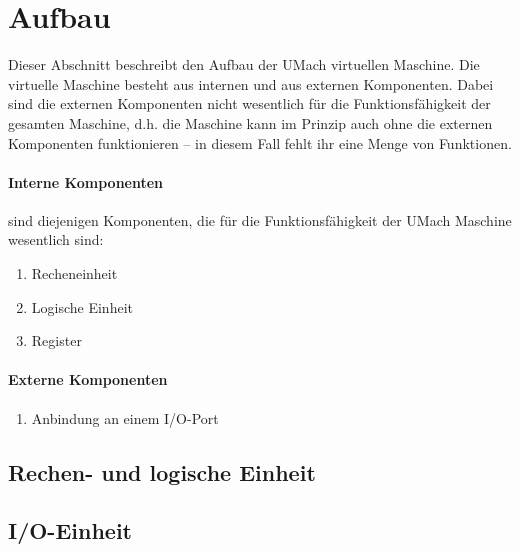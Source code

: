 \section{Aufbau}
\label{sec:Aufbau}
Dieser Abschnitt beschreibt den Aufbau der UMach virtuellen Maschine.
Die virtuelle Maschine besteht aus internen und aus externen Komponenten. Dabei
sind die externen Komponenten nicht wesentlich für die Funktionsfähigkeit der
gesamten Maschine, d.h. die Maschine kann im Prinzip auch ohne die externen
Komponenten funktionieren -- in diesem Fall fehlt ihr eine Menge von Funktionen.

\paragraph{Interne Komponenten}
sind diejenigen Komponenten, die für die Funktionsfähigkeit der UMach
Maschine wesentlich sind:
\begin{enumerate}
  \item Recheneinheit
  \item Logische Einheit
  \item Register
\end{enumerate}


\paragraph{Externe Komponenten}

\begin{enumerate}
  \item Anbindung an einem I/O-Port
\end{enumerate}





\subsection{Rechen- und logische Einheit}
\blindtext

\subsection{I/O-Einheit}
\blindtext

